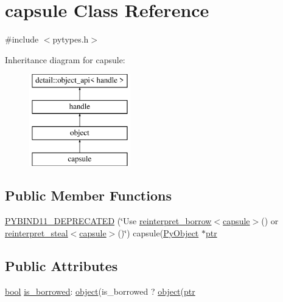 \hypertarget{classcapsule}{}\section{capsule Class Reference}
\label{classcapsule}


{\ttfamily \#include $<$pytypes.\+h$>$}

Inheritance diagram for capsule\+:\begin{figure}[H]
\begin{center}
\leavevmode
\includegraphics[height=4.000000cm]{classcapsule}
\end{center}
\end{figure}
\subsection*{Public Member Functions}
\begin{DoxyCompactItemize}
\item 
\mbox{\hyperlink{classcapsule_a461da1cc0a43114173609990128e23d4}{P\+Y\+B\+I\+N\+D11\+\_\+\+D\+E\+P\+R\+E\+C\+A\+T\+ED}} (\char`\"{}Use \mbox{\hyperlink{classobject_ac1ea1a4cbcf197d7c8096037633720d7}{reinterpret\+\_\+borrow}}$<$\mbox{\hyperlink{classcapsule}{capsule}}$>$() or \mbox{\hyperlink{classobject_ae1de2ab5a755c10582ac1e46071de5c5}{reinterpret\+\_\+steal}}$<$\mbox{\hyperlink{classcapsule}{capsule}}$>$()\char`\"{}) capsule(\mbox{\hyperlink{_python27_2object_8h_aadc84ac7aed2cfa6f20c25f62bf3dac7}{Py\+Object}} $\ast$\mbox{\hyperlink{classhandle_afcd412ba4cbffd7d1e3c9338746b2682}{ptr}}
\end{DoxyCompactItemize}
\subsection*{Public Attributes}
\begin{DoxyCompactItemize}
\item 
\mbox{\hyperlink{asdl_8h_af6a258d8f3ee5206d682d799316314b1}{bool}} \mbox{\hyperlink{classcapsule_a95816c90b9bf7ed133bd05c1f59a84e4}{is\+\_\+borrowed}}\+: \mbox{\hyperlink{classobject}{object}}(is\+\_\+borrowed ? \mbox{\hyperlink{classobject}{object}}(\mbox{\hyperlink{classhandle_afcd412ba4cbffd7d1e3c9338746b2682}{ptr}}
\end{DoxyCompactItemize}
